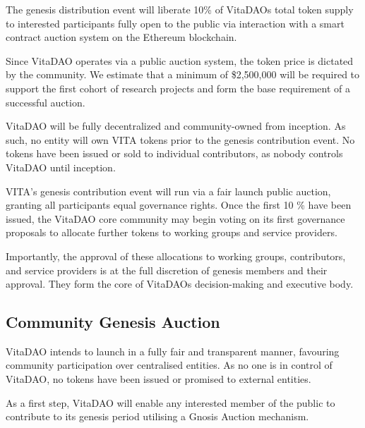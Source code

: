 \documentclass[12pt,letterpaper]{article}
\begin{document}
The genesis distribution event will liberate 10\% of VitaDAOs total token supply to interested participants fully open to the public via interaction with a smart contract auction system on the Ethereum blockchain.

Since VitaDAO operates via a public auction system, the token price is dictated by the community. We estimate that a minimum of \$2,500,000 will be required to support the first cohort of research projects and form the base requirement of a successful auction.

VitaDAO will be fully decentralized and community-owned from inception. As such, no entity will own VITA tokens prior to the genesis contribution event. No tokens have been issued or sold to individual contributors, as nobody controls VitaDAO until inception.

VITA’s genesis contribution event will run via a fair launch public auction, granting all participants equal governance rights. Once the first 10 \% have been issued, the VitaDAO core community may begin voting on its first governance proposals to allocate further tokens to working groups and service providers.

Importantly, the approval of these allocations to working groups, contributors, and service providers is at the full discretion of genesis members and their approval. They form the core of VitaDAOs decision-making and executive body.

\subsection{Community Genesis Auction}
VitaDAO intends to launch in a fully fair and transparent manner, favouring community participation over centralised entities. As no one is in control of VitaDAO, no tokens have been issued or promised to external entities.

As a first step, VitaDAO will enable any interested member of the public to contribute to its genesis period utilising a Gnosis Auction mechanism.
\end{document}
